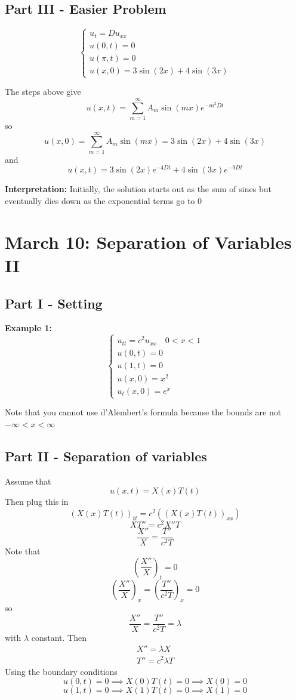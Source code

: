 \documentclass[12pt]{article}
\begin{document}
\subsection*{Part III - Easier Problem}
\[\begin{cases}
    u_t = Du_{xx}\\
    u(0, t) = 0\\
    u(\pi, t) = 0\\
    u(x, 0) = 3\sin(2x) + 4\sin(3x)
\end{cases}\]

The steps above give 
\[u(x, t) = \sum_{ m=1}^\infty A_m \sin(mx)e^{-m^2Dt}\] 
so 
\[u(x, 0) = \sum_{ m=1}^\infty A_m \sin(mx) = 3\sin(2x) + 4\sin(3x)\]
and 
\[\boxed{u(x, t) = 3\sin(2x)e^{-4Dt} + 4\sin(3x)e^{-9Dt}}\]

\textbf{Interpretation:} Initially, the solution starts out as the sum of sines but eventually dies down as the exponential terms go to 0

\section{March 10: Separation of Variables II}
\subsection*{Part I - Setting}
\textbf{Example 1:}
\[\begin{cases}
    u_{tt} = c^2 u_{xx} \quad 0 < x < 1\\
    u(0, t) = 0\\
    u(1, t) = 0\\
    u(x, 0) = x^2\\
    u_t(x, 0) = e^x
\end{cases}\] 

Note that you cannot use d'Alembert's formula because the bounds are not $-\infty < x < \infty$

\subsection*{Part II - Separation of variables}
Assume that 
\[u(x, t) = X(x) T(t)\]
Then plug this in 
\[(X(x)T(t))_{tt} = c^2((X(x)T(t))_{xx})\]
\[XT'' = c^2X''T\]
\[\frac{X''}{X} =  \frac{T''}{c^2T}\]
Note that 
\[\left(\frac{X''}{X}\right)_t = 0\]
\[\left(\frac{X''}{X}\right)_x = \left(\frac{T''}{c^2T}\right)_x = 0\]
so 
\[\frac{X''}{X} =  \frac{T''}{c^2T} = \lambda\]
with $\lambda$ constant. Then 
\begin{align*}
    X'' = \lambda X\\
    T'' = c^2\lambda T
\end{align*}
Using the boundary conditions
\[u(0, t) = 0 \implies X(0)T(t)= 0 \implies X(0) = 0\]
\[u(1, t) = 0 \implies X(1)T(t)= 0 \implies X(1) = 0\]
\end{document}
